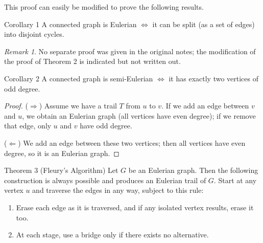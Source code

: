 \documentclass[11pt]{scrartcl}
\theoremstyle{plain}
\theoremstyle{remark}
\newtheorem*{remark}{Remark}
\begin{document}
\medskip
\noindent This proof can easily be modified to prove the following results.

\begin{thmbox}{Corollary 1}
A connected graph is Eulerian $\iff$ it can be split (as a set of edges) into disjoint cycles.
\end{thmbox}

\begin{remark}
No separate proof was given in the original notes; the modification of the proof of Theorem 2 is indicated but not written out.
\end{remark}

\begin{thmbox}{Corollary 2}
A connected graph is semi-Eulerian $\iff$ it has exactly two vertices of odd degree.
\end{thmbox}

\begin{proof}
($\Rightarrow$) Assume we have a trail $T$ from $u$ to $v$. If we add an edge between $v$ and $u$, we obtain an Eulerian graph (all vertices have even degree); if we remove that edge, only $u$ and $v$ have odd degree.

\medskip
\noindent ($\Leftarrow$) We add an edge between these two vertices; then all vertices have even degree, so it is an Eulerian graph.
\end{proof}

\begin{thmbox}{{Theorem 3 (Fleury's Algorithm)}}
Let $G$ be an Eulerian graph. Then the following construction is always possible and produces an Eulerian trail of $G$. Start at any vertex $u$ and traverse the edges in any way, subject to this rule:
\begin{enumerate}
  \item Erase each edge as it is traversed, and if any isolated vertex results, erase it too.
  \item At each stage, use a bridge only if there exists no alternative.
\end{enumerate}
\end{thmbox}
\end{document}

